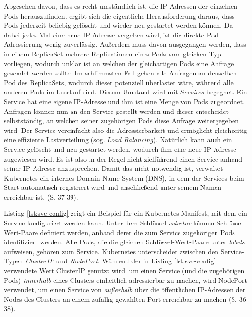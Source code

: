 \documentclass[11pt,a4paper]{article}
\begin{document}
Abgesehen davon, dass es recht umständlich ist, die IP-Adressen der einzelnen Pods herauszufinden,
ergibt sich die eigentliche Herausforderung daraus, dass Pods jederzeit beliebig gelöscht
und wieder neu gestartet werden können. Da dabei jedes Mal eine neue IP-Adresse vergeben wird,
ist die direkte Pod-Adressierung wenig zuverlässig. Außerdem muss davon ausgegangen werden, dass
in einem ReplicaSet mehrere Replikationen eines Pods vom gleichen Typ vorliegen, wodurch unklar ist
an welchen der gleichartigen Pods eine Anfrage gesendet werden sollte. Im schlimmsten Fall gehen alle Anfragen
an denselben Pod des ReplicaSets, wodurch dieser potenziell überlastet wäre, während alle anderen Pods im Leerlauf sind.
Diesem Umstand wird mit \emph{Services} begegnet. Ein Service hat eine eigene IP-Adresse und ihm ist eine Menge
von Pods zugeordnet. Anfragen können nun an den Service gestellt werden und dieser entscheidet selbstständig,
an welchen seiner zugehörigen Pods diese Anfrage weitergegeben wird. Der Service vereinfacht also die
Adressierbarkeit und ermöglicht gleichzeitig eine effiziente Lastverteilung (sog. \emph{Load Balancing}).
Natürlich kann auch ein Service gelöscht und neu gestartet werden, wodurch ihm eine neue IP-Adresse zugewiesen wird.
Es ist also in der Regel nicht zielführend einen Service anhand seiner IP-Adresse anzusprechen.
Damit das nicht notwendig ist, verwaltet Kubernetes ein internes Domain-Name-System (DNS), in dem
der Services beim Start automatisch registriert wird und anschließend unter seinem Namen
erreichbar ist. \cite{Schmeling_Dargatz_2022} (S. 37-39).

Listing \ref{lst:svc-config} zeigt ein Beispiel für ein Kubernetes Manifest,
mit dem ein Service konfiguriert werden kann.
Unter dem Schlüssel \emph{selector} können Schlüssel-Wert-Paare definiert werden,
anhand derer die zum Service zugehörigen Pods identifiziert werden. Alle Pods, die
die gleichen Schlüssel-Wert-Paare unter \emph{labels} aufweisen, gehören zum Service.
Kubernetes unterscheidet zwischen den Service-Typen \emph{ClusterIP} und \emph{NodePort}.
Während der in Listing \ref{lst:svc-config} verwendete Wert ClusterIP genutzt wird, um einen Service
(und die zugehörigen Pods) \emph{innerhalb} eines Clusters
einheitlich adressierbar zu machen, wird NodePort verwendet, um einen Service von \emph{außerhalb}
über die öffentlichen IP-Adressen der Nodes des Clusters an einem zufällig gewählten Port erreichbar zu machen \cite{Schmeling_Dargatz_2022} (S. 36-38).

\end{document}
